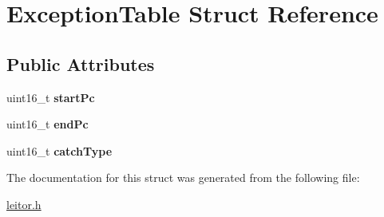 \hypertarget{structExceptionTable}{}\section{Exception\+Table Struct Reference}
\label{structExceptionTable}
\subsection*{Public Attributes}
\begin{DoxyCompactItemize}
\item 
\mbox{\label{structExceptionTable_a04ab9fcb6779181df0079a864f442e15}} 
uint16\+\_\+t {\bfseries start\+Pc}
\item 
\mbox{\label{structExceptionTable_a89792e3b2a4737f8f2441fed7ec15aac}} 
uint16\+\_\+t {\bfseries end\+Pc}
\item 
\mbox{\label{structExceptionTable_ac9dbcf3326262a17a88c1ed875d6459f}} 
uint16\+\_\+t {\bfseries catch\+Type}
\end{DoxyCompactItemize}


The documentation for this struct was generated from the following file\+:\begin{DoxyCompactItemize}
\item 
\mbox{\hyperlink{leitor_8h}{leitor.\+h}}\end{DoxyCompactItemize}
